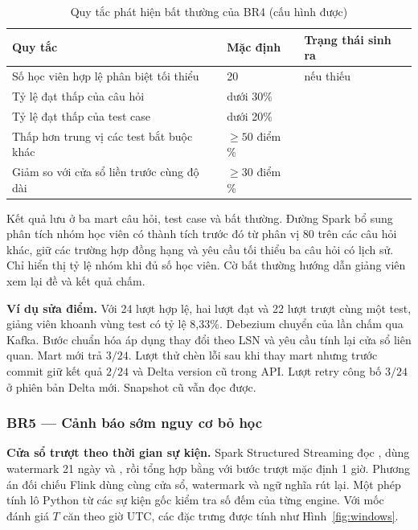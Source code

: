 \begin{table}[H]
\centering\small
\caption{Quy tắc phát hiện bất thường của BR4 (cấu hình được)}\label{tab:br4-rules}
\begin{tabularx}{\textwidth}{@{}YL{2.4cm}L{5.0cm}@{}}
\toprule
\textbf{Quy tắc} & \textbf{Mặc định} & \textbf{Trạng thái sinh ra} \\
\midrule
Số học viên hợp lệ phân biệt tối thiểu & 20 &  nếu thiếu \\
Tỷ lệ đạt thấp của câu hỏi & dưới 30\% &  \\
Tỷ lệ đạt thấp của test case & dưới 20\% &  \\
Thấp hơn trung vị các test bắt buộc khác & $\ge 50$ điểm \% &  \\
Giảm so với cửa sổ liền trước cùng độ dài & $\ge 30$ điểm \% &  \\
\bottomrule
\end{tabularx}
\end{table}

Kết quả lưu ở ba mart câu hỏi, test case và bất thường. Đường Spark bổ sung phân tích nhóm học viên có thành tích trước đó từ phân vị 80 trên các câu hỏi khác, giữ các trường hợp đồng hạng và yêu cầu tối thiểu ba câu hỏi có lịch sử. Chỉ hiển thị tỷ lệ nhóm khi đủ số học viên. Cờ bất thường hướng dẫn giảng viên xem lại đề và kết quả chấm.

\textbf{Ví dụ sửa điểm.} Với 24 lượt hợp lệ, hai lượt đạt và 22 lượt trượt cùng một test, giảng viên khoanh vùng test có tỷ lệ 8{,}33\%. Debezium chuyển  của lần chấm qua Kafka. Bước chuẩn hóa áp dụng thay đổi theo LSN và yêu cầu tính lại cửa sổ liên quan. Mart mới trả $3/24$. Lượt thử chèn lỗi sau khi thay mart nhưng trước commit giữ kết quả $2/24$ và Delta version cũ trong API. Lượt retry công bố $3/24$ ở phiên bản Delta mới. Snapshot cũ vẫn đọc được.

\subsubsection{BR5 --- Cảnh báo sớm nguy cơ bỏ học}

\textbf{Cửa sổ trượt theo thời gian sự kiện.} Spark Structured Streaming đọc , dùng watermark 21 ngày và , rồi tổng hợp bằng  với bước trượt mặc định 1 giờ. Phương án đối chiếu Flink dùng cùng cửa sổ, watermark và ngữ nghĩa rút lại. Một phép tính lô Python từ các sự kiện gốc kiểm tra số đếm của từng engine. Với mốc đánh giá $T$ căn theo giờ UTC, các đặc trưng được tính như Hình~\ref{fig:windows}.

